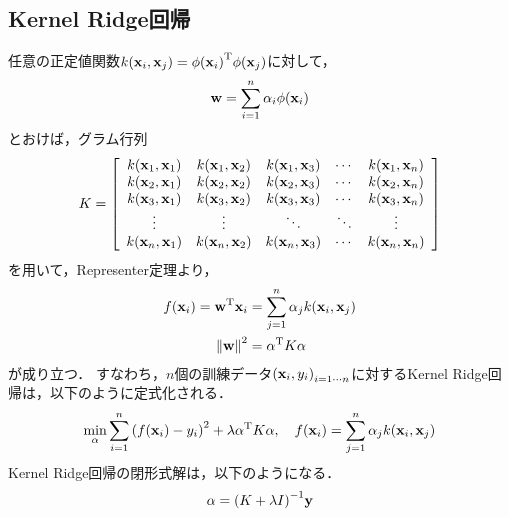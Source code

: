 \documentclass[11pt,a4j]{jarticle}
\newcommand\norm[1]{\left\lVert#1\right\rVert}
\begin{document}
    \subsection{Kernel Ridge回帰}
      任意の正定値関数$k({\bf x}_i, {\bf x}_j) = {\phi({\bf x}_i)}^{\mathrm{T}} \phi({\bf x}_j)$に対して，
      \begin{align}
        {\bf w} = \sum_{i=1}^{n} \alpha_i \phi({\bf x}_i)
      \end{align}
      とおけば，グラム行列
      \begin{align}
        K = 
        \left[
          \begin{array}{ccccc}
            k({\bf x}_1, {\bf x}_1) & k({\bf x}_1, {\bf x}_2) & k({\bf x}_1, {\bf x}_3) & \cdots & k({\bf x}_1, {\bf x}_n) \\
            k({\bf x}_2, {\bf x}_1) & k({\bf x}_2, {\bf x}_2) & k({\bf x}_2, {\bf x}_3) & \cdots & k({\bf x}_2, {\bf x}_n) \\
            k({\bf x}_3, {\bf x}_1) & k({\bf x}_3, {\bf x}_2) & k({\bf x}_3, {\bf x}_3) & \cdots & k({\bf x}_3, {\bf x}_n) \\
            \vdots&\vdots&\ddots&\ddots&\vdots \\
            k({\bf x}_n, {\bf x}_1) & k({\bf x}_n, {\bf x}_2) & k({\bf x}_n, {\bf x}_3) & \cdots & k({\bf x}_n, {\bf x}_n)
          \end{array}
        \right]
      \end{align}
      を用いて，Representer定理より，
      \begin{align}
        f({\bf x}_i) = {\bf w}^{\mathrm{T}} {\bf x}_i &= \sum_{j=1}^{n} \alpha_j k({\bf x}_i, {\bf x}_j) \\
        {\norm{ \bf w }}^{2} &= {\bf \alpha}^{\mathrm{T}} K {\bf \alpha}
      \end{align}
      が成り立つ．
      すなわち，$n$個の訓練データ${({\bf x}_i, y_i)}_{i = 1 \cdots n}$に対するKernel Ridge回帰は，以下のように定式化される．
      \begin{align}
        \min_{\bf \alpha} \sum_{i=1}^{n} { \left( f({\bf x}_i) - y_i \right) }^{2} + \lambda {\bf \alpha}^{\mathrm{T}} K {\bf \alpha}, ~~~
        f({\bf x}_i) =  \sum_{j=1}^{n} \alpha_j k({\bf x}_i, {\bf x}_j)
      \end{align}
      Kernel Ridge回帰の閉形式解は，以下のようになる．
      \begin{align}
        {\bf \alpha} = { ( K + \lambda I ) }^{-1} {\bf y}
      \end{align}
\end{document}
